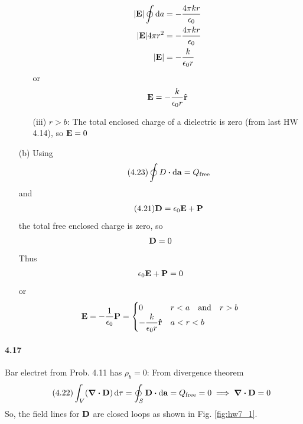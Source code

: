 \documentclass[../main.tex]{subfiles}
\begin{document}
\begin{itemize}
\begin{itemize}
\begin{align*}
            \abs{\vb E} \oint \dd{a} &= -\frac{4\pi k r}{\epsilon_0} \\
            \abs{\vb E} 4\pi r^2 &= -\frac{4\pi k r}{\epsilon_0} \\
            \abs{\vb E} &= -\frac{k}{\epsilon_0 r} 
        \end{align*}
        or 
        \begin{align*}
            \vb E = -\frac{k}{\epsilon_0 r} \vu r
        \end{align*}
        \item [(iii)] $r > b$: The total enclosed charge of a dielectric is zero (from last HW 4.14), so $\vb E = 0$
    \end{itemize}
    \item [(b)] Using
    \begin{align*} \tag{4.23}\label{eq:4.23}
        \oint D \vdot \dd{\vb a} = Q_\text{free}
    \end{align*}
    and 
    \begin{align*} \tag{4.21} \label{eq:4.21}
        \vb D = \epsilon_0 \vb E + \vb P
    \end{align*}
    the total free enclosed charge is zero, so
    \begin{align*}
        \vb D = 0
    \end{align*}
    Thus
    \begin{align*}
        \epsilon_0 \vb E + \vb P = 0 
    \end{align*}
    or
    \begin{align*}
        \vb E = -\frac{1}{\epsilon_0} \vb P = \begin{cases}
            0 & r < a \qand r > b \\
            -\dfrac{k}{\epsilon_0 r} \vu r & a < r < b
        \end{cases}
    \end{align*}
\end{itemize}

\newpage
\paragraph{4.17} Bar electret from Prob. 4.11 has $\rho_b = 0$: From divergence theorem
\begin{align*}\tag{4.22}
    \int_V (\div \vb D) \dd{\tau} = \oint_S \vb D \vdot \dd{\vb a} = Q_\text{free} = 0 \implies \div \vb D = 0
\end{align*}
So, the field lines for $\vb D$ are closed loops as shown in Fig. \ref{fig:hw7_1}.
\end{document}
